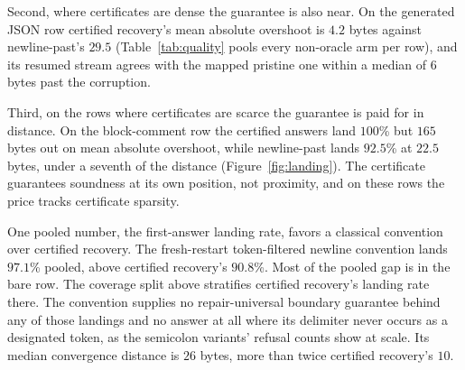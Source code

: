 \documentclass[11pt,a4paper]{article}
\theoremstyle{definition}
\theoremstyle{plain}
\theoremstyle{remark}
\begin{document}
Second, where certificates are dense the guarantee is also near. On the generated JSON row certified recovery's mean
absolute overshoot is $4.2$ bytes against newline-past's $29.5$ (Table~\ref{tab:quality} pools every non-oracle arm per
row), and its resumed stream agrees with the mapped pristine one within a median of $6$ bytes past the corruption.

Third, on the rows where certificates are scarce the guarantee is paid for in distance. On the block-comment row the
certified answers land $100$\% but $165$ bytes out on mean absolute overshoot, while newline-past lands $92.5$\% at
$22.5$ bytes, under a seventh of the distance (Figure~\ref{fig:landing}). The certificate guarantees soundness at its
own position, not proximity, and on these rows the price tracks certificate sparsity.

One pooled number, the first-answer landing rate, favors a classical convention over certified recovery. The
fresh-restart token-filtered newline convention lands $97.1$\% pooled, above certified recovery's $90.8$\%. Most of the
pooled gap is in the bare row. The coverage split above stratifies certified recovery's landing rate there. The
convention supplies no repair-universal boundary guarantee behind any of those landings and no answer at all where its
delimiter never occurs as a designated token, as the semicolon variants' refusal counts show at scale. Its median
convergence distance is $26$ bytes, more than twice certified recovery's $10$.
\end{document}
